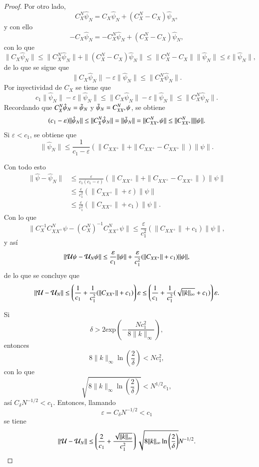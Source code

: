 \begin{proof}
    Por otro lado, 
    \[
    C_X^N \hat{\psi}_N = C_X \hat{\psi}_N + (C_X^N - C_X) \hat{\psi}_N,
    \]
    y con ello
    \[
    -C_X \hat{\psi}_N = -C_X^N \hat{\psi}_N + (C_X^N - C_X) \hat{\psi}_N,
    \]
    con lo que
    \[
    \| C_X \hat{\psi}_N \| \leq \| C_X^N \hat{\psi}_N \| + \| (C_X^N - C_X) \hat{\psi}_N \| \leq \| C_X^N - C_X \| \| \hat{\psi}_N \| \leq \varepsilon \| \hat{\psi}_N \|,
    \]
    de lo que se sigue que
    \[
    \| C_X \hat{\psi}_N \| - \varepsilon \| \hat{\psi}_N \| \leq \| C_X^N \hat{\psi}_N \|.
    \]
    Por inyectividad de $C_X$ se tiene que
    \[
    c_1 \| \hat{\psi}_N \| - \varepsilon \| \hat{\psi}_N \| \leq \| C_X \hat{\psi}_N \| - \varepsilon \| \hat{\psi}_N \| \leq \| C_X^N \hat{\psi}_N \|.
    \]
    Recordando que $C_X^N \hat{\psi}_N =  \Tilde{\psi}_N$ y $\Tilde{\psi}_N = C_{XX^+}^N \psi$, se obtiene
    \[
    (c_1 - \varepsilon) \| \hat{\psi}_N \| \leq \| C_X^N \hat{\psi}_N \| = \| \Tilde{\psi}_N \| = \| C_{XX^+}^N \psi \| \leq \| C_{XX^+}^N \| \| \psi \|.
    \]
    Si $\varepsilon < c_1$, se obtiene que
    \[
    \| \hat{\psi}_N \| \leq \frac{1}{c_1 - \varepsilon}
    (\| C_{XX^+} \| + \| C_{XX^+} - C_{XX^+} \| ) \| \psi \|.
    \]

    Con todo esto
    \[
    \begin{aligned}
        \| \hat{\psi} - \hat{\psi}_N \| & \leq \frac{\varepsilon}{c_1(c_1 - \varepsilon)}
    (\| C_{XX^+} \| + \| C_{XX^+} - C_{XX^+} \| ) \| \psi \| \\
    & \leq \frac{\varepsilon}{c_1^2}
    (\| C_{XX^+} \| + \varepsilon ) \| \psi \| \\
    & \leq \frac{\varepsilon}{c_1^2}
    (\| C_{XX^+} \| + c_1 ) \| \psi \|.
    \end{aligned}
    \]
    Con lo que
    \[
    \| C_X^{-1} C_{XX^+}^N \psi - \left (C_X^N \right )^{-1} C_{XX^+}^N \psi \| \leq \frac{\varepsilon}{c_1^2}
    (\| C_{XX^+} \| + c_1 ) \| \psi \|,
    \]
    y así
    \[
    \| \mathcal{U} \psi - \mathcal{U}_N \psi \| \leq \frac{\varepsilon}{c_1} \| \psi \| + \frac{\varepsilon}{c_1^2}
    (\| C_{XX^+} \| + c_1 ) \| \psi \|,
    \]
    de lo que se concluye que
    \[
    \| \mathcal{U} - \mathcal{U}_N \| \leq \left ( \frac{1}{c_1} + \frac{1}{c_1^2}
    (\| C_{XX^+} \| + c_1 ) \right ) \varepsilon \leq \left ( \frac{1}{c_1} + \frac{1}{c_1^2}
    (\sqrt{\| k \|_{\infty}} + c_1 ) \right ) \varepsilon.
    \]

    Si
    \[
    \delta > 2\text{exp} \left ( - \frac{N c_1^2}{8 \| k \|_\infty} \right ),
    \]
    entonces
    \[
    8 \| k \|_{\infty} \ln \left ( \frac{2}{\delta} \right ) < N c_1^2,
    \]
    con lo que
    \[
    \sqrt{8 \| k \|_{\infty} \ln \left ( \frac{2}{\delta} \right )} < N^{1/2} c_1,
    \]
    así $C_\delta N^{-1/2} < c_1$. Entonces, llamando
    \[
    \varepsilon = C_\delta N^{-1/2} < c_1
    \]
    se tiene
     \[
    \| \mathcal{U} - \mathcal{U}_N \| \leq \left ( \frac{2}{c_1} + \frac{\sqrt{\| k \|_{\infty}}}{c_1^2}
  \right )\sqrt{8 \| k \|_\infty \ln \left ( \frac{2}{\delta}\right ) } N^{-1/2}.
    \]
\end{proof}

